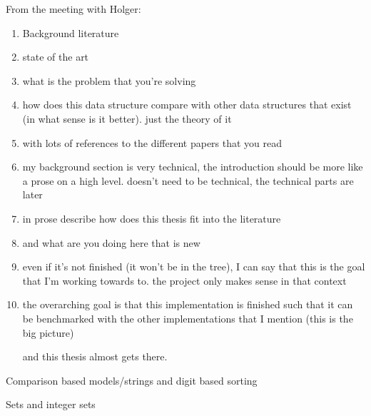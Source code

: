 From the meeting with Holger:
\begin{enumerate}
    \item
    Background literature
    
    \item
    state of the art
    
    \item
    what is the problem that you're solving
    
    \item
    how does this data structure compare with other data structures that exist (in what sense is it better). just the theory of it
    
    \item
    with lots of references to the different papers that you read
    
    \item
    my background section is very technical, the introduction should be more like a prose on a high level. doesn't need to be technical, the technical parts are later
    
    \item
    in prose describe how does this thesis fit into the literature
    
    \item
    and what are you doing here that is new
    
    \item
    even if it's not finished (it won't be in the tree), I can say that this is the goal that I'm working towards to. the project only makes sense in that context
    
    \item
    the overarching goal is that this implementation is finished such that it can be benchmarked with the other implementations that I mention (this is the big picture)
    
    and this thesis almost gets there.
\end{enumerate}


Comparison based models/strings and digit based sorting

Sets and integer sets

